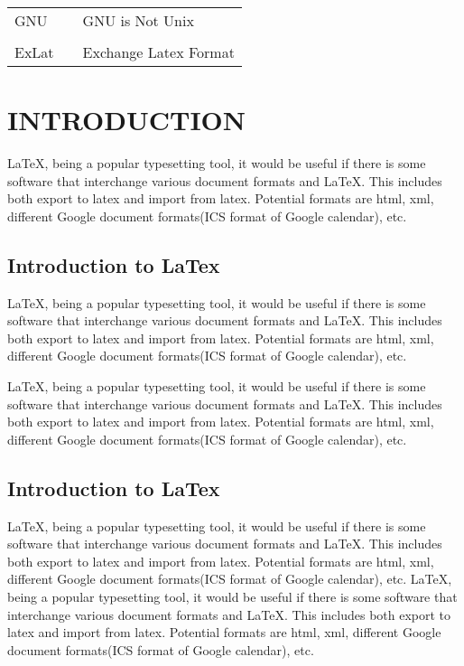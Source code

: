 \documentclass[a4paper,10pt]{mesreport}
\begin{document}
\begin{tabular}{ l l  l } 

GNU &  &GNU is Not Unix\\
\\
ExLat &  &Exchange Latex Format

\end{tabular} 

\newpage

\chapter{INTRODUCTION}
LaTeX, being a popular typesetting tool, it would be useful if there is some software that interchange
various document formats and LaTeX. This includes both export to latex and import from latex.
Potential formats are html, xml, different Google document formats(ICS format of Google calendar), etc.
\section{Introduction to LaTex}
LaTeX, being a popular typesetting tool, it would be useful if there is some software that interchange
various document formats and LaTeX. This includes both export to latex and import from latex.
Potential formats are html, xml, different Google document formats(ICS format of Google calendar), etc.

LaTeX, being a popular typesetting tool, it would be useful if there is some software that interchange
various document formats and LaTeX. This includes both export to latex and import from latex.
Potential formats are html, xml, different Google document formats(ICS format of Google calendar), etc.

\section{Introduction to LaTex}
LaTeX, being a popular typesetting tool, it would be useful if there is some software that interchange
various document formats and LaTeX. This includes both export to latex and import from latex.
Potential formats are html, xml, different Google document formats(ICS format of Google calendar), etc.
LaTeX, being a popular typesetting tool, it would be useful if there is some software that interchange
various document formats and LaTeX. This includes both export to latex and import from latex.
Potential formats are html, xml, different Google document formats(ICS format of Google calendar), etc.
\end{document}

